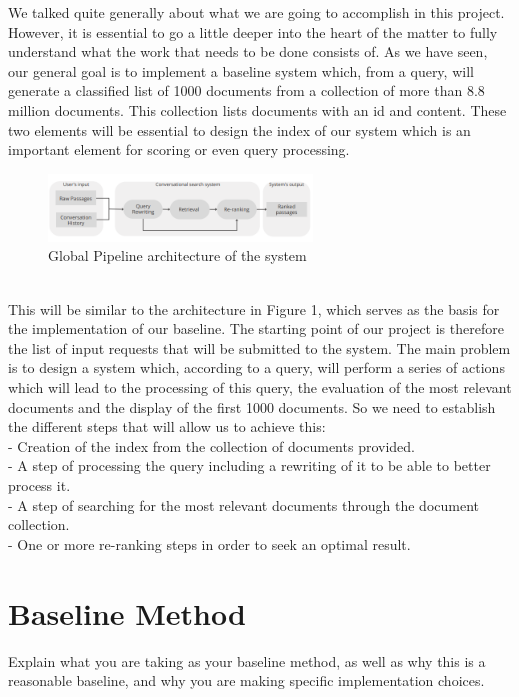 \documentclass[sigconf]{acmart}
\begin{document}
We talked quite generally about what we are going to accomplish in this project. However, it is essential to go a little deeper into the heart of the matter to fully understand what the work that needs to be done consists of. As we have seen, our general goal is to implement a baseline system which, from a query, will generate a classified list of 1000 documents from a collection of more than 8.8 million documents. This collection lists documents with an id and content. These two elements will be essential to design the index of our system which is an important element for scoring or even query processing.\\
\begin{figure}[h]
    \includegraphics[width=7cm]{pipeline.png}
    \caption{Global Pipeline architecture of the system}
    \label{figure:1}
\end{figure}\\
  This will be similar to the architecture in Figure 1, which serves as the basis for the implementation of our baseline. The starting point of our project is therefore the list of input requests that will be submitted to the system. The main problem is to design a system which, according to a query, will perform a series of actions which will lead to the processing of this query, the evaluation of the most relevant documents and the display of the first 1000 documents. So we need to establish the different steps that will allow us to achieve this:\\
- Creation of the index from the collection of documents provided.\\
- A step of processing the query including a rewriting of it to be able to better process it.\\
- A step of searching for the most relevant documents through the document collection.\\
- One or more re-ranking steps in order to seek an optimal result.\\


\section{Baseline Method}

Explain what you are taking as your baseline method, as well as why this is a reasonable baseline, and why you are making specific implementation choices.
\end{document}
